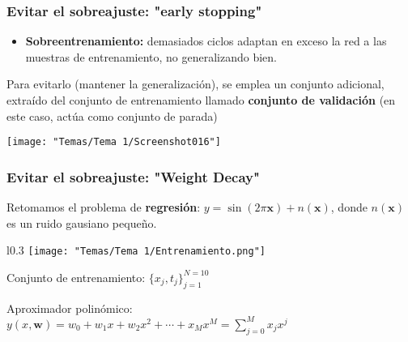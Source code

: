 \subsubsection{Evitar el sobreajuste: "early stopping"}
\begin{itemize}[label=\color{lightblue}$\RHD$]
	\item \textbf{Sobreentrenamiento:} demasiados ciclos adaptan en exceso la red a las muestras de entrenamiento, no generalizando bien.
\end{itemize}
Para evitarlo (mantener la generalización), se emplea un conjunto adicional, extraído del conjunto de entrenamiento llamado \textbf{conjunto de validación} (en este caso, actúa como conjunto de parada)
\begin{center}
	\texttt{[image: "Temas/Tema 1/Screenshot016"]}
\end{center}
\subsubsection{Evitar el sobreajuste: "Weight Decay"}
Retomamos el problema de \textbf{regresión}: $y=\sin(2\pi\mathbf{x})+n(\mathbf{x})$, donde $n(\mathbf{x})$ es un ruido gausiano pequeño.

\begin{wrapfigure}[3]{l}{0.3\textwidth}
	\texttt{[image: "Temas/Tema 1/Entrenamiento.png"]}
\end{wrapfigure}

Conjunto de entrenamiento: $\{x_j,t_j\}_{j=1}^{N=10}$

\begin{flushright}
\end{flushright}

Aproximador polinómico: $y(x,\mathbf{w})=w_0+w_1x+w_2x^2+\cdots+x_Mx^M=\sum_{j=0}^{M}x_jx^j$

